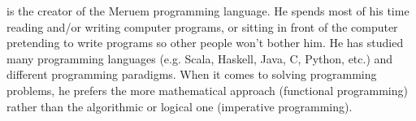  is the creator of the Meruem programming language. He spends most of his time reading and/or writing computer programs, or sitting in front of the computer pretending to write programs so other people won't bother him. He has studied many programming languages (e.g. Scala, Haskell, Java, C, Python, etc.) and different programming paradigms. When it comes to solving programming problems, he prefers the more mathematical approach (functional programming) rather than the algorithmic or logical one (imperative programming). 